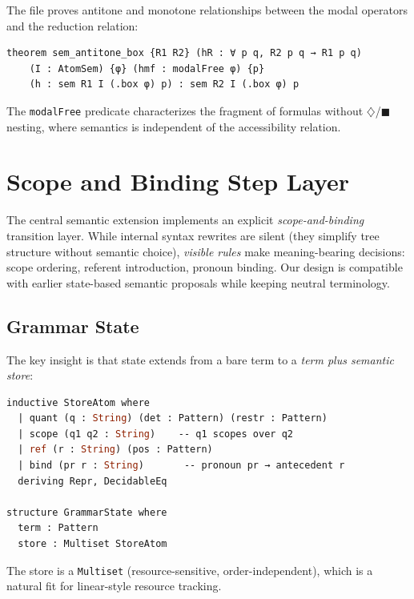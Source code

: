 \documentclass[11pt]{article}
\newcommand{\code}[1]{\texttt{#1}}
\newcommand{\Dia}{\ensuremath{\diamondsuit}}
\newcommand{\Bx}{\ensuremath{\blacksquare}}
\begin{document}
The file proves antitone and monotone relationships between the modal
operators and the reduction relation:

\begin{lstlisting}[language=ml,caption={Box is antitone in R for modal-free formulas}]
theorem sem_antitone_box {R1 R2} (hR : ∀ p q, R2 p q → R1 p q)
    (I : AtomSem) {φ} (hmf : modalFree φ) {p}
    (h : sem R1 I (.box φ) p) : sem R2 I (.box φ) p
\end{lstlisting}

\noindent The \code{modalFree} predicate characterizes the fragment of
formulas without $\Dia$/$\Bx$ nesting, where semantics is independent of
the accessibility relation.

\section{Scope and Binding Step Layer}
\label{sec:visible}

The central semantic extension implements an explicit \emph{scope-and-binding}
transition layer.
While internal syntax rewrites are silent (they simplify tree structure
without semantic choice), \emph{visible rules} make meaning-bearing
decisions: scope ordering, referent introduction, pronoun binding.
Our design is compatible with earlier state-based semantic proposals while
keeping neutral terminology.

\subsection{Grammar State}

The key insight is that state extends from a bare term to a
\emph{term plus semantic store}:

\begin{lstlisting}[language=ml,caption={Grammar state = term + store}]
inductive StoreAtom where
  | quant (q : String) (det : Pattern) (restr : Pattern)
  | scope (q1 q2 : String)    -- q1 scopes over q2
  | ref (r : String) (pos : Pattern)
  | bind (pr r : String)       -- pronoun pr → antecedent r
  deriving Repr, DecidableEq

structure GrammarState where
  term : Pattern
  store : Multiset StoreAtom
\end{lstlisting}

The store is a \code{Multiset} (resource-sensitive, order-independent),
which is a natural fit for linear-style resource tracking.
\end{document}
